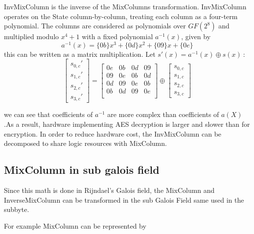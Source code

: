 \documentclass[10pt, conference, compsocconf]{IEEEtran}
\begin{document}
InvMixColumn is the inverse of the MixColumns transformation. InvMixColumn operates on the State column-by-column, treating each column as a four-term polynomial. The columns are considered as polynomials over $GF(2^8)$ and multiplied modulo $x^4 + 1 $ with a fixed polynomial $a^{-1}(x)$, given by 
\begin{equation}
a^{-1}(x) = \{0b\}x^3 + \{0d\}x^2 + \{09\}x + \{0e\}
\end{equation}
this can be written as a matrix multiplication. Let 
$s'(x) = a^{-1}(x) \oplus s(x)~ :$
\begin{equation}
\left[ \begin{array}{c}
s_{0,c}' \\s_{1,c}' \\s_{2,c}' \\s_{3,c}' \end{array} \right] =
\left[ \begin{array}{cccccccc}
0e & 0b & 0d & 09\\
09 & 0e & 0b & 0d\\
0d & 09 & 0e & 0b\\
0b & 0d & 09 & 0e\\
 \end{array} \right] \oplus
 \left[ \begin{array}{c}
s_{0,c}\\s_{1,c}\\s_{2,c}\\s_{3,c} \end{array} \right]
\end{equation}

we can see that coefficients of $a^{-1}$ are more complex than coefficients of $a(X)$.As a result, hardware implementing AES decryption is larger and slower than for encryption. In order to reduce hardware cost, the InvMixColumn can be decomposed to share logic resources with MixColumn.

\subsection {MixColumn in sub galois field}
Since this math is done in Rijndael's Galois field, the MixColumn and InverseMixColumn can be transformed in the sub Galois Field same used in the subbyte.

For example MixColumn can be represented by
\end{document}
